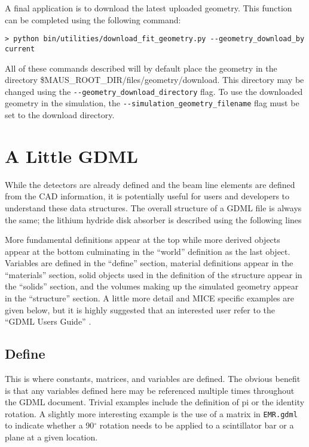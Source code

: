 A final application is to download the latest uploaded geometry. This
function can be completed using the following command:
\begin{verbatim}
> python bin/utilities/download_fit_geometry.py --geometry_download_by current
\end{verbatim}
All of these commands described will by default place the geometry in
the directory \${MAUS\_ROOT\_DIR}/files/geometry/download. This
directory may be changed using the
\verb+--geometry_download_directory+ flag. To use the downloaded
geometry in the simulation, the \verb+--simulation_geometry_filename+
flag must be set to the download directory. 

\usepackage{listings}

\section{A Little GDML}
While the detectors are already defined and the beam line elements are
defined from the CAD information, it is potentially useful for users
and developers to understand these data structures. The overall
structure of a GDML file is always the same; the lithium hydride disk
absorber is described using the following lines


 More fundamental definitions appear at the top while more derived
 objects appear at the bottom culminating in the ``world'' definition
 as the last object. Variables are defined in the ``define'' section,
 material definitions appear in the ``materials'' section, solid
 objects used in the definition of the structure appear in the
 ``solids'' section, and the volumes making up the simulated geometry
 appear in the ``structure'' section.  A little more detail and MICE
 specific examples are given below, but it is highly suggested that an
 interested user refer to the ``GDML Users Guide'' \cite{}.

\subsection{Define}
This is where constants, matrices, and variables are defined. The
obvious benefit is that any variables defined here may be referenced
multiple times throughout the GDML document. Trivial examples include
the definition of pi or the identity rotation. A slightly more
interesting example is the use of a matrix in \verb+EMR.gdml+ to
indicate whether a 90$^{\circ}$ rotation needs to be applied to a
scintillator bar or a plane at a given location.

